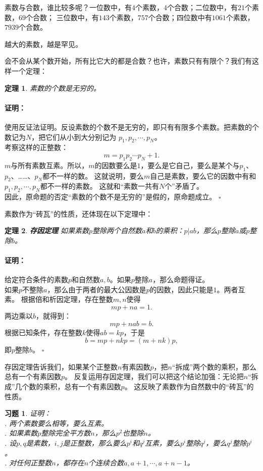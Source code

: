 \documentclass[12pt,UTF8]{ctexbook}
\newtheorem{tm}{定理}[section]
\newenvironment{proof2}{\paragraph{\textbf{证明：}}}{\hfill$\square$}
\newtheorem{xt}{习题}[section]
\begin{document}
素数与合数，谁比较多呢？一位数中，有$4$个素数，$4$个合数；二位数中，有$21$个素数，$69$个合数；
三位数中，有$143$个素数，$757$个合数；四位数中有$1061$个素数，$7939$个合数。

越大的素数，越是罕见。

会不会从某个数开始，所有比它大的都是合数？也许，素数只有有限个？我们有这样一个定理：

\begin{tm}\label{tm:1-0-10}
    素数的个数是无穷的。
\end{tm}
\begin{proof2}
    使用反证法证明。反设素数的个数不是无穷的，即只有有限多个素数。把素数的个数记为$N$，把它们从小到大分别记为
    $p_1, p_2,\cdots , p_N$。\\
    考察这样的正整数：
    $$ m = p_1p_2\cdots p_N + 1.$$
    $m$与所有素数互素。所以，$m$的因数要么是$1$，要么是它自己，要么是某个与$p_1$、$p_2$、……、$p_N$都不一样的数。
    这就说明，要么$m$自己是素数，要么它的因数中有和$p_1, p_2,\cdots , p_N$都不一样的素数。
    这就和“素数一共有$N$个”矛盾了。\\
    因此，原命题的否定“素数的个数不是无穷的”是假的，原命题成立。
\end{proof2}

素数作为“砖瓦”的性质，还体现在以下定理中：
\begin{tm}{\textbf{存因定理 }}\label{tm:1-0-20}
    如果素数$p$整除两个自然数$a$和$b$的乘积：$p | ab$，那么$p$整除$a$或$p$整除$b$。
\end{tm}
\begin{proof2}
    给定符合条件的素数$p$和自然数$a,b$。如果$p$整除$a$，那么命题得证。\\
    如果$p$不整除$a$，那么由于两者的最大公因数是$p$的因数，因此只能是$1$。两者互素。
    根据倍和析因定理，存在整数$m,n$使得
    $$ mp + na = 1.$$
    两边乘以$b$，就得到：
    $$ mp + nab = b. $$
    根据已知条件，存在整数$k$使得$ab = kp$，于是 
    $$ b = mp + nkp = (m + nk)p,$$
    即$p$整除$b$。
\end{proof2}

存因定理告诉我们，如果某个正整数$n$有素因数$p$，把$n$“拆成”两个数的乘积，那么总有一个有素因数$p$。
反复运用存因定理，我们可以把这个结论加强：无论把$n$“拆成”几个数的乘积，总有一个有素因数$p$。
这反映了素数作为自然数中的“砖瓦”的性质。

\begin{xt}\label{xt:1-0-0}
    证明：\\
    . 两个素数要么相等，要么互素。\\
    . 如果素数$p$整除完全平方数$n$，那么$p^2$也整除$n$。\\
    . 设$p,q$是素数，$i,j$是正整数，那么要么$p^i$和$q^j$互素，要么$p^i$整除$q^j$，要么$q^j$整除$p^i$。\\
    . 对任何正整数$n$，都存在$n$个连续合数$a, a+1, \cdots , a+n-1$。
\end{xt}
\end{document}
